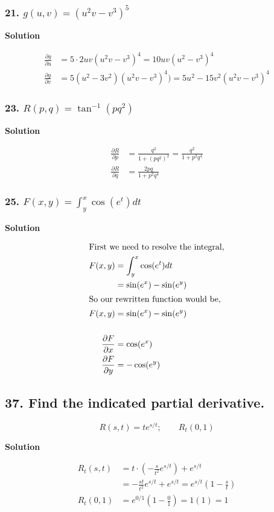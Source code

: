 \documentclass{article}
\newcommand{\solution}{\centerline{\textbf{Solution}}}
\begin{document}
\subsubsection*{21. $g(u, v) = (u^2v-v^3)^5$}
\solution
\begin{align*}
    \frac{\partial g}{\partial u} &= 5 \cdot 2uv(u^2v-v^3)^4 = 10uv(u^2-v^3)^4 \\
    \frac{\partial g}{\partial v} &= 5(u^2-3v^2)(u^2v-v^3)^4) = 5u^2-15v^2(u^2v-v^3)^4
\end{align*}
\subsubsection*{23. $R(p, q) = \tan^{-1} (pq^2)$}
\solution
\begin{align*}
    \frac{\partial R}{\partial p} &= \displaystyle\frac{q^2}{1+(pq^2)^2} = \displaystyle\frac{q^2}{1+p^2q^4} \\
    \frac{\partial R}{\partial q} &= \displaystyle\frac{2pq}{1+p^2q^4}
\end{align*}
\subsubsection*{25. $F(x,y) = \int_y^x \cos (e^t) dt$}
\solution
\begin{align*}
    \intertext{First we need to resolve the integral,}
    F(x,y) &= \int_y^x \cos (e^t) dt \\
           &= \sin (e^x) - \sin (e^y) \\
    \intertext{So our rewritten function would be,}
    F(x,y) &= \sin (e^x) - \sin (e^y) \\\\
    \frac{\partial F}{\partial x} &= \cos (e^x) \\
    \frac{\partial F}{\partial y} &= -\cos (e^y) 
\end{align*}
\subsection*{37. Find the indicated partial derivative.}
\[
    R(s,t) = te^{s/t}; \qquad R_t (0,1)
\]
\solution
\begin{align*}
    R_t(s,t) &= t\cdot\left(-\displaystyle\frac s {t^2} e^{s/t}\right) + e^{s/t} \\
             &= -\displaystyle\frac{st}{t^2}e^{s/t} + e^{s/t} = e^{s/t} \left( 1 - \frac s t\right) \\
    R_t(0,1) &= e^{0/1}(1-\frac 0 1) = 1(1) = 1
\end{align*}
\end{document}
